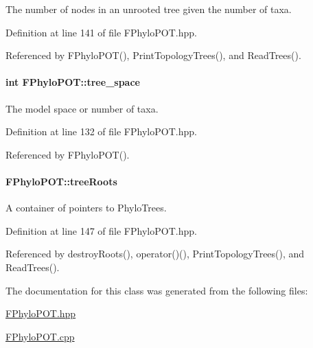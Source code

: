 \-The number of nodes in an unrooted tree given the number of taxa. 



\-Definition at line 141 of file \-F\-Phylo\-P\-O\-T.\-hpp.



\-Referenced by \-F\-Phylo\-P\-O\-T(), \-Print\-Topology\-Trees(), and \-Read\-Trees().

\hypertarget{classFPhyloPOT_a84a8fb3afb2b975331062752d414723a}{
\paragraph[{tree\-\_\-space}]{\setlength{\rightskip}{0pt plus 5cm}int {\bf \-F\-Phylo\-P\-O\-T\-::tree\-\_\-space}}}\label{classFPhyloPOT_a84a8fb3afb2b975331062752d414723a}


\-The model space or number of taxa. 



\-Definition at line 132 of file \-F\-Phylo\-P\-O\-T.\-hpp.



\-Referenced by \-F\-Phylo\-P\-O\-T().

\hypertarget{classFPhyloPOT_a99124f9f8855b0aebcccd20804ef9cde}{
\paragraph[{tree\-Roots}]{ {\bf \-F\-Phylo\-P\-O\-T\-::tree\-Roots}}}\label{classFPhyloPOT_a99124f9f8855b0aebcccd20804ef9cde}


\-A container of pointers to \-Phylo\-Trees. 



\-Definition at line 147 of file \-F\-Phylo\-P\-O\-T.\-hpp.



\-Referenced by destroy\-Roots(), operator()(), \-Print\-Topology\-Trees(), and \-Read\-Trees().



\-The documentation for this class was generated from the following files\-:\begin{DoxyCompactItemize}
\item 
\hyperlink{FPhyloPOT_8hpp}{\-F\-Phylo\-P\-O\-T.\-hpp}\item 
\hyperlink{FPhyloPOT_8cpp}{\-F\-Phylo\-P\-O\-T.\-cpp}\end{DoxyCompactItemize}
